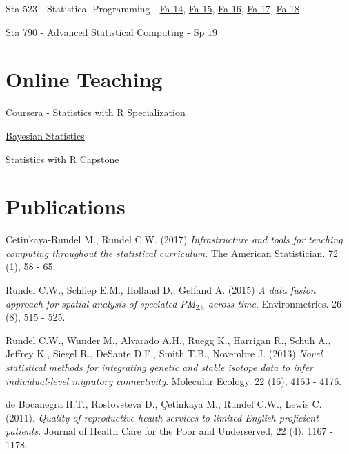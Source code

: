 \documentclass[margin,line]{res}
\begin{document}
\begin{resume}
\begin{list1}
\item[] Sta 523 - Statistical Programming - \href{https://stat.duke.edu/~cr173/Sta523_Fa14/}{Fa 14}, \href{https://stat.duke.edu/~cr173/Sta523_Fa15/}{Fa 15}, \href{https://stat.duke.edu/~cr173/Sta523_Fa16/}{Fa 16}, \href{https://stat.duke.edu/~cr173/Sta523_Fa17/}{Fa 17}, \href{https://stat.duke.edu/~cr173/Sta523_Fa18/}{Fa 18}

\item[] Sta 790 - Advanced Statistical Computing - \href{http://stat.duke.edu/~cr173/Sta790_Sp16/}{Sp 19}
\end{list1}

\pagebreak


\section{\sc Online Teaching}

Coursera - \href{https://www.coursera.org/specializations/statistics}{Statistics with R Specialization}
\begin{list1}
\item[] \href{https://www.coursera.org/learn/bayesian}{Bayesian Statistics}
\item[] \href{https://www.coursera.org/learn/statistics-project}{Statistics with R Capstone}
\end{list1}

\section{\sc Publications}

Cetinkaya-Rundel M., Rundel C.W. (2017) {\em Infrastructure and tools for teaching computing throughout the statistical curriculum}. The American Statistician. 72 (1), 58 - 65.

\vspace{-0.15cm}
Rundel C.W., Schliep E.M., Holland D., Gelfand A. (2015) {\em A data fusion approach for spatial analysis of speciated PM$_{2.5}$ across time}. Environmetrics. 26 (8), 515 - 525.

\vspace{-0.15cm}
Rundel C.W., Wunder M., Alvarado A.H., Ruegg K., Harrigan R., Schuh A., Jeffrey K., Siegel R., DeSante D.F., Smith T.B., Novembre J. (2013) {\em Novel statistical methods for integrating genetic and stable isotope data to infer individual-level migratory connectivity}. Molecular Ecology. 22 (16), 4163 - 4176.

\vspace{-0.15cm}
de Bocanegra H.T., Rostovsteva D., \c{C}etinkaya M., Rundel C.W., Lewis C. (2011). {\em Quality of reproductive health services to limited English proficient patients}. Journal of Health Care for the Poor and Underserved, 22 (4), 1167 - 1178.


\end{resume}
\end{document}
